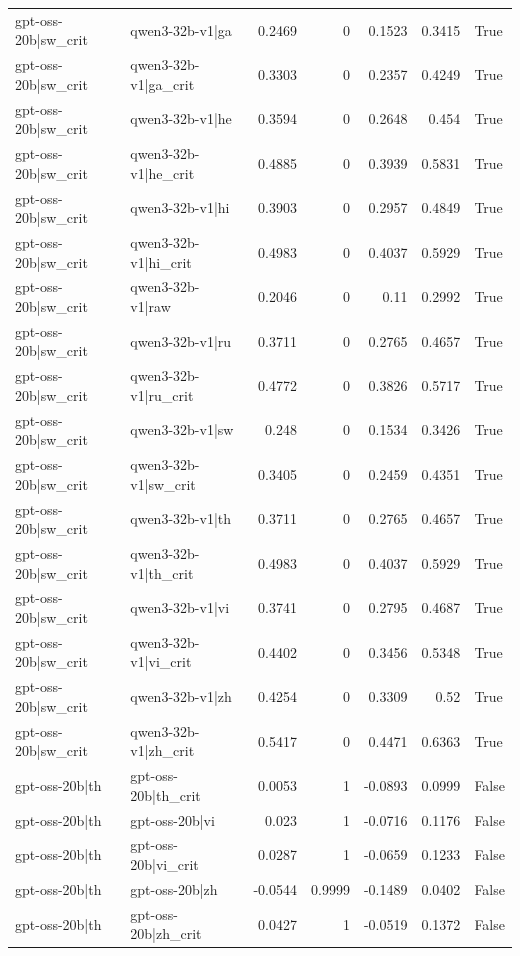 \begin{table}
\begin{tabular}{l l r r r r l}
gpt-oss-20b|sw_crit & qwen3-32b-v1|ga & 0.2469 & 0 & 0.1523 & 0.3415 & True \\
gpt-oss-20b|sw_crit & qwen3-32b-v1|ga_crit & 0.3303 & 0 & 0.2357 & 0.4249 & True \\
gpt-oss-20b|sw_crit & qwen3-32b-v1|he & 0.3594 & 0 & 0.2648 & 0.454 & True \\
gpt-oss-20b|sw_crit & qwen3-32b-v1|he_crit & 0.4885 & 0 & 0.3939 & 0.5831 & True \\
gpt-oss-20b|sw_crit & qwen3-32b-v1|hi & 0.3903 & 0 & 0.2957 & 0.4849 & True \\
gpt-oss-20b|sw_crit & qwen3-32b-v1|hi_crit & 0.4983 & 0 & 0.4037 & 0.5929 & True \\
gpt-oss-20b|sw_crit & qwen3-32b-v1|raw & 0.2046 & 0 & 0.11 & 0.2992 & True \\
gpt-oss-20b|sw_crit & qwen3-32b-v1|ru & 0.3711 & 0 & 0.2765 & 0.4657 & True \\
gpt-oss-20b|sw_crit & qwen3-32b-v1|ru_crit & 0.4772 & 0 & 0.3826 & 0.5717 & True \\
gpt-oss-20b|sw_crit & qwen3-32b-v1|sw & 0.248 & 0 & 0.1534 & 0.3426 & True \\
gpt-oss-20b|sw_crit & qwen3-32b-v1|sw_crit & 0.3405 & 0 & 0.2459 & 0.4351 & True \\
gpt-oss-20b|sw_crit & qwen3-32b-v1|th & 0.3711 & 0 & 0.2765 & 0.4657 & True \\
gpt-oss-20b|sw_crit & qwen3-32b-v1|th_crit & 0.4983 & 0 & 0.4037 & 0.5929 & True \\
gpt-oss-20b|sw_crit & qwen3-32b-v1|vi & 0.3741 & 0 & 0.2795 & 0.4687 & True \\
gpt-oss-20b|sw_crit & qwen3-32b-v1|vi_crit & 0.4402 & 0 & 0.3456 & 0.5348 & True \\
gpt-oss-20b|sw_crit & qwen3-32b-v1|zh & 0.4254 & 0 & 0.3309 & 0.52 & True \\
gpt-oss-20b|sw_crit & qwen3-32b-v1|zh_crit & 0.5417 & 0 & 0.4471 & 0.6363 & True \\
gpt-oss-20b|th & gpt-oss-20b|th_crit & 0.0053 & 1 & -0.0893 & 0.0999 & False \\
gpt-oss-20b|th & gpt-oss-20b|vi & 0.023 & 1 & -0.0716 & 0.1176 & False \\
gpt-oss-20b|th & gpt-oss-20b|vi_crit & 0.0287 & 1 & -0.0659 & 0.1233 & False \\
gpt-oss-20b|th & gpt-oss-20b|zh & -0.0544 & 0.9999 & -0.1489 & 0.0402 & False \\
gpt-oss-20b|th & gpt-oss-20b|zh_crit & 0.0427 & 1 & -0.0519 & 0.1372 & False \\

\end{tabular}
\end{table}
